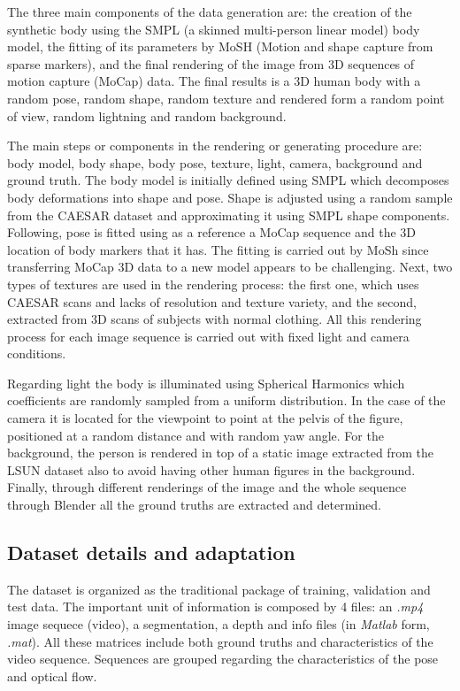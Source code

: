 The three main components of the data generation are: the creation of the synthetic body using the SMPL (a skinned multi-person linear model) body model, the fitting of its parameters by MoSH (Motion and shape capture from sparse markers), and the final rendering of the image from 3D sequences of motion capture (MoCap) data. The final results is a 3D human body with a random pose, random shape, random texture and rendered form a random point of view, random lightning and random background.\newline

The main steps or components in the rendering or generating procedure are: body model, body shape, body pose, texture, light, camera, background and ground truth. The body model is initially defined using SMPL which decomposes body deformations into shape and pose. Shape is adjusted using a random sample from the CAESAR dataset and approximating it using SMPL shape components. Following, pose is fitted using as a reference a MoCap sequence and the 3D location of body markers that it has. The fitting is carried out by MoSh since transferring MoCap 3D data to a new model appears to be challenging. Next, two types of textures are used in the rendering process: the first one, which uses CAESAR scans and lacks of resolution and texture variety, and the second, extracted from 3D scans of subjects with normal clothing. All this rendering process for each image sequence is carried out with fixed light and camera conditions.\newline 

Regarding light the body is illuminated using Spherical Harmonics which coefficients are randomly sampled from a uniform distribution. In the case of the camera it is located for the viewpoint  to point at the pelvis of the figure, positioned at a random distance and  with random yaw angle. For the background, the person is rendered in top of a static image extracted from the LSUN dataset also to avoid having other human figures in the background. Finally, through different renderings of the image and the whole sequence through Blender all the ground truths are extracted and determined.

\subsection{Dataset details and adaptation}

The dataset is organized as the traditional package of training, validation and test data. The important unit of information is composed by 4 files: an \textit{.mp4} image sequece (video), a segmentation, a depth and info files (in \textit{Matlab} form, \textit{.mat}). All these matrices include both ground truths and characteristics of the video sequence. Sequences are grouped regarding the characteristics of the pose and optical flow.\newline

